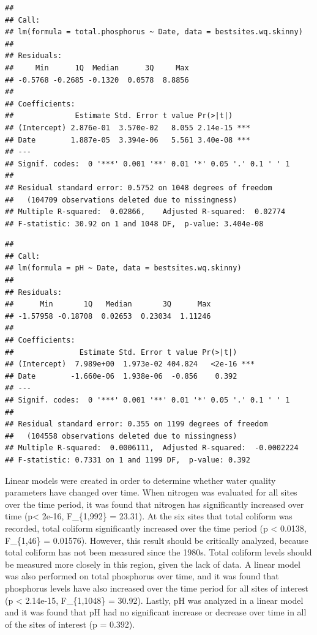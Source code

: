 \documentclass[12pt,]{article}
\begin{document}
\begin{verbatim}
## 
## Call:
## lm(formula = total.phosphorus ~ Date, data = bestsites.wq.skinny)
## 
## Residuals:
##     Min      1Q  Median      3Q     Max 
## -0.5768 -0.2685 -0.1320  0.0578  8.8856 
## 
## Coefficients:
##              Estimate Std. Error t value Pr(>|t|)    
## (Intercept) 2.876e-01  3.570e-02   8.055 2.14e-15 ***
## Date        1.887e-05  3.394e-06   5.561 3.40e-08 ***
## ---
## Signif. codes:  0 '***' 0.001 '**' 0.01 '*' 0.05 '.' 0.1 ' ' 1
## 
## Residual standard error: 0.5752 on 1048 degrees of freedom
##   (104709 observations deleted due to missingness)
## Multiple R-squared:  0.02866,    Adjusted R-squared:  0.02774 
## F-statistic: 30.92 on 1 and 1048 DF,  p-value: 3.404e-08
\end{verbatim}

\begin{verbatim}
## 
## Call:
## lm(formula = pH ~ Date, data = bestsites.wq.skinny)
## 
## Residuals:
##      Min       1Q   Median       3Q      Max 
## -1.57958 -0.18708  0.02653  0.23034  1.11246 
## 
## Coefficients:
##               Estimate Std. Error t value Pr(>|t|)    
## (Intercept)  7.989e+00  1.973e-02 404.824   <2e-16 ***
## Date        -1.660e-06  1.938e-06  -0.856    0.392    
## ---
## Signif. codes:  0 '***' 0.001 '**' 0.01 '*' 0.05 '.' 0.1 ' ' 1
## 
## Residual standard error: 0.355 on 1199 degrees of freedom
##   (104558 observations deleted due to missingness)
## Multiple R-squared:  0.0006111,  Adjusted R-squared:  -0.0002224 
## F-statistic: 0.7331 on 1 and 1199 DF,  p-value: 0.392
\end{verbatim}

Linear models were created in order to determine whether water quality
parameters have changed over time. When nitrogen was evaluated for all
sites over the time period, it was found that nitrogen has significantly
increased over time (p\textless{} 2e-16, F\_\{1,992\} = 23.31). At the
six sites that total coliform was recorded, total coliform significantly
increased over the time period (p \textless{} 0.0138, F\_\{1,46\} =
0.01576). However, this result should be critically analyzed, because
total coliform has not been measured since the 1980s. Total coliform
levels should be measured more closely in this region, given the lack of
data. A linear model was also performed on total phosphorus over time,
and it was found that phosphorus levels have also increased over the
time period for all sites of interest (p \textless{} 2.14e-15,
F\_\{1,1048\} = 30.92). Lastly, pH was analyzed in a linear model and it
was found that pH had no significant increase or decrease over time in
all of the sites of interest (p = 0.392).
\end{document}
